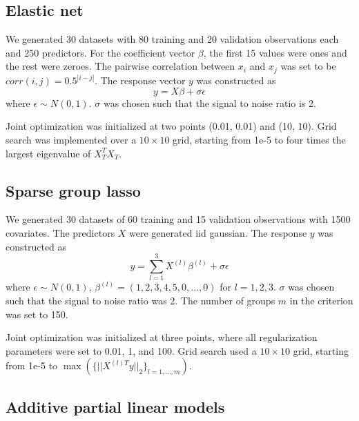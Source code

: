 \documentclass[10pt,letterpaper]{article}
\begin{document}
\subsection{Elastic net}
We generated 30 datasets with 80 training and 20 validation observations each and 250 predictors. For the coefficient vector $\beta$, the first 15 values were ones and the rest were zeroes. The pairwise correlation between $x_i$ and $x_j$ was set to be $corr(i,j) = 0.5^{|i-j|}$. The response vector $y$ was constructed as
\begin{equation}
y = X\beta + \sigma \epsilon
\end{equation}
where $\epsilon \sim N(0, 1)$. $\sigma$ was chosen such that the signal to noise ratio is 2.

Joint optimization was initialized at two points (0.01, 0.01) and (10, 10). Grid search was implemented over a $10 \times 10$ grid, starting from 1e-5 to four times the largest eigenvalue of $X_T^T X_T$.

\subsection{Sparse group lasso}

We generated 30 datasets of 60 training and 15 validation observations with 1500 covariates. The predictors $X$ were generated iid gaussian. The response $y$ was constructed as
\begin{equation}
y = \sum\limits_{l=1}^3 X^{(l)} \beta^{(l)} + \sigma \epsilon
\end{equation}
where $\epsilon \sim N(0, 1)$, $\beta^{(l)} = (1, 2, 3, 4, 5, 0, ..., 0)$ for $l = 1, 2, 3$. $\sigma$ was chosen such that the signal to noise ratio was 2. The number of groups $m$ in the criterion was set to 150.

Joint optimization was initialized at three points, where all regularization parameters were set to 0.01, 1, and 100. Grid search used a $10 \times 10$ grid, starting from 1e-5 to $\max(\{||X^{(l)T}y ||_2\}_{l=1,..., m})$.

\subsection{Additive partial linear models}
\end{document}
